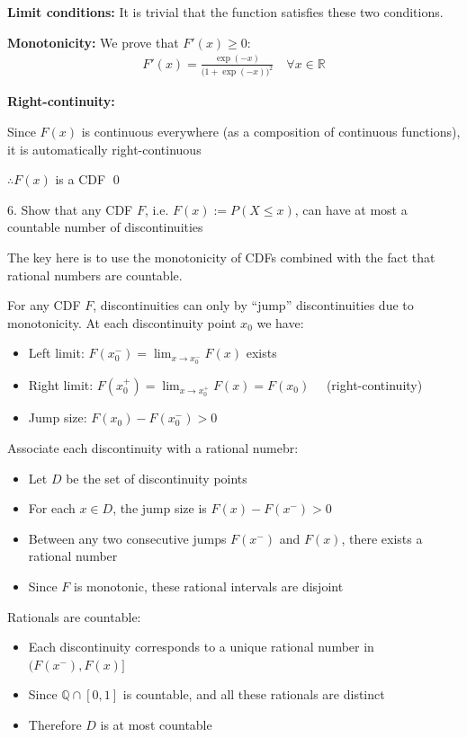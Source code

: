 \documentclass[10pt]{article}
\begin{document}
\textbf{Limit conditions:} It is trivial that the function satisfies these two conditions.

\textbf{Monotonicity:} We prove that $F'(x) \geq 0$:
\begin{gather*}
    F'(x) = \frac{\exp(-x)}{\big(1 + \exp(-x)\big)^2} \quad\forall x \in \mathbb{R}
\end{gather*}

\textbf{Right-continuity:} 

Since $F(x)$ is continuous everywhere (as a composition of continuous functions), it is automatically right-continuous

$\therefore F(x)$ is a CDF \qed 

\newpage

6. Show that any CDF $F$, i.e. $F(x) := P(X \leq x)$, can have at most a countable number of discontinuities

The key here is to use the monotonicity of CDFs combined with the fact that rational numbers are countable.

For any CDF $F$, discontinuities can only by ``jump'' discontinuities due to monotonicity. 
At each discontinuity point $x_0$ we have:

\begin{itemize}
    \item Left limit: $F(x_0^-) = \lim_{x \to x_0^-}F(x)$ exists
    \item Right limit: $F(x_0^+) = \lim_{x \to x_0^+} F(x) = F(x_0)\quad$ (right-continuity)
    \item Jump size: $F(x_0) - F(x_0^-) > 0$
\end{itemize}

\hfill

Associate each discontinuity with a rational numebr: 
\begin{itemize}
    \item Let $D$ be the set of discontinuity points
    \item For each $x \in D$, the jump size is $F(x) - F(x^-) > 0$
    \item Between any two consecutive jumps $F(x^-)$ and $F(x)$, there exists a rational number
    \item Since $F$ is monotonic, these rational intervals are disjoint
\end{itemize}

\hfill 

Rationals are countable: 
\begin{itemize}
    \item Each discontinuity corresponds to a unique rational number in $(F(x^-), F(x)]$
    \item Since $\mathbb{Q} \cap [0, 1]$ is countable, and all these rationals are distinct
    \item Therefore $D$ is at most countable
\end{itemize}
\end{document}

